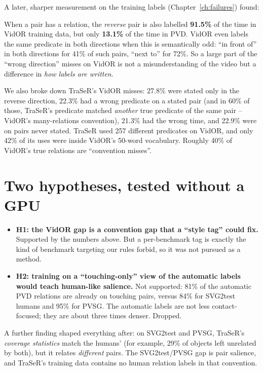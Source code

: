 \documentclass[11pt,openany]{book}
\begin{document}
A later, sharper measurement on the training labels (Chapter~\ref{ch:failures}) found:
\begin{keyidea}
When a pair has a relation, the \emph{reverse} pair is also labelled \textbf{91.5\%} of the time in VidOR training data, but only
\textbf{13.1\%} of the time in PVD. VidOR even labels the same predicate in both directions when this is semantically odd: ``in front
of'' in both directions for 41\% of such pairs, ``next to'' for 72\%. So a large part of the ``wrong direction'' misses on VidOR is
not a misunderstanding of the video but a difference in \emph{how labels are written}.
\end{keyidea}

We also broke down TraSeR's VidOR misses: 27.8\% were stated only in the reverse direction, 22.3\% had a wrong predicate on a stated
pair (and in 60\% of those, TraSeR's predicate matched \emph{another} true predicate of the same pair -- VidOR's many-relations
convention), 21.3\% had the wrong time, and 22.9\% were on pairs never stated. TraSeR used 257 different predicates on VidOR, and
only 42\% of its uses were inside VidOR's 50-word vocabulary. Roughly 40\% of VidOR's true relations are ``convention misses''.

\section*{Two hypotheses, tested without a GPU}
\begin{itemize}
  \item \textbf{H1: the VidOR gap is a convention gap that a ``style tag'' could fix.} Supported by the numbers above. But a
  per-benchmark tag is exactly the kind of benchmark targeting our rules forbid, so it was not pursued as a method.
  \item \textbf{H2: training on a ``touching-only'' view of the automatic labels would teach human-like salience.} Not supported:
  81\% of the automatic PVD relations are already on touching pairs, versus 84\% for SVG2test humans and 95\% for PVSG. The
  automatic labels are not less contact-focused; they are about three times denser. Dropped.
\end{itemize}
A further finding shaped everything after: on SVG2test and PVSG, TraSeR's \emph{coverage statistics} match the humans' (for
example, 29\% of objects left unrelated by both), but it relates \emph{different} pairs. The SVG2test/PVSG gap is pair salience, and
TraSeR's training data contains no human relation labels in that convention.
\end{document}
